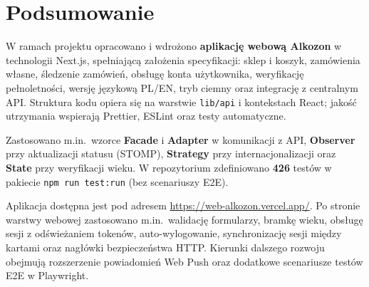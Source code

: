 \documentclass[12pt,a4paper]{report}
\newcommand{\blok}[1]{\needspace{9\baselineskip}#1}
\begin{document}
\chapter{Podsumowanie}

\blok{%
W ramach projektu opracowano i wdrożono \textbf{aplikację webową Alkozon} w technologii Next.js, spełniającą założenia specyfikacji: sklep i koszyk, zamówienia własne, śledzenie zamówień, obsługę konta użytkownika, weryfikację pełnoletności, wersję językową PL/EN, tryb ciemny oraz integrację z centralnym API. Struktura kodu opiera się na warstwie \texttt{lib/api} i kontekstach React; jakość utrzymania wspierają Prettier, ESLint oraz testy automatyczne.

Zastosowano m.in.\ wzorce \textbf{Facade} i \textbf{Adapter} w komunikacji z API, \textbf{Observer} przy aktualizacji statusu (STOMP), \textbf{Strategy} przy internacjonalizacji oraz \textbf{State} przy weryfikacji wieku. W repozytorium zdefiniowano \textbf{426} testów w pakiecie \texttt{npm run test:run} (bez scenariuszy E2E).

Aplikacja dostępna jest pod adresem \url{https://web-alkozon.vercel.app/}. Po stronie warstwy webowej zastosowano m.in.\ walidację formularzy, bramkę wieku, obsługę sesji z odświeżaniem tokenów, auto-wylogowanie, synchronizację sesji między kartami oraz nagłówki bezpieczeństwa HTTP. Kierunki dalszego rozwoju obejmują rozszerzenie powiadomień Web Push oraz dodatkowe scenariusze testów E2E w Playwright.
}
\end{document}
